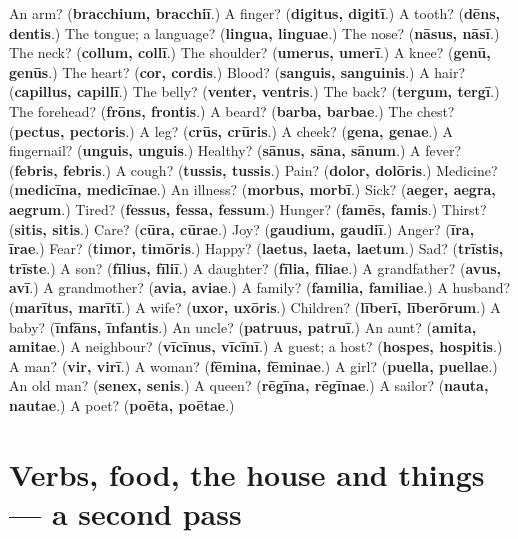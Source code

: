 \begin{tcolorbox}[breakable,colback=teal!4,colframe=teal!35!black,title={Before you move on}]
An arm? (\textbf{bracchium, bracchiī}.) A finger? (\textbf{digitus, digitī}.) A tooth? (\textbf{dēns, dentis}.) The tongue; a language? (\textbf{lingua, linguae}.) The nose? (\textbf{nāsus, nāsī}.) The neck? (\textbf{collum, collī}.) The shoulder? (\textbf{umerus, umerī}.) A knee? (\textbf{genū, genūs}.) The heart? (\textbf{cor, cordis}.) Blood? (\textbf{sanguis, sanguinis}.) A hair? (\textbf{capillus, capillī}.) The belly? (\textbf{venter, ventris}.) The back? (\textbf{tergum, tergī}.) The forehead? (\textbf{frōns, frontis}.) A beard? (\textbf{barba, barbae}.) The chest? (\textbf{pectus, pectoris}.) A leg? (\textbf{crūs, crūris}.) A cheek? (\textbf{gena, genae}.) A fingernail? (\textbf{unguis, unguis}.) Healthy? (\textbf{sānus, sāna, sānum}.) A fever? (\textbf{febris, febris}.) A cough? (\textbf{tussis, tussis}.) Pain? (\textbf{dolor, dolōris}.) Medicine? (\textbf{medicīna, medicīnae}.) An illness? (\textbf{morbus, morbī}.) Sick? (\textbf{aeger, aegra, aegrum}.) Tired? (\textbf{fessus, fessa, fessum}.) Hunger? (\textbf{famēs, famis}.) Thirst? (\textbf{sitis, sitis}.) Care? (\textbf{cūra, cūrae}.) Joy? (\textbf{gaudium, gaudiī}.) Anger? (\textbf{īra, īrae}.) Fear? (\textbf{timor, timōris}.) Happy? (\textbf{laetus, laeta, laetum}.) Sad? (\textbf{trīstis, trīste}.) A son? (\textbf{fīlius, fīliī}.) A daughter? (\textbf{fīlia, fīliae}.) A grandfather? (\textbf{avus, avī}.) A grandmother? (\textbf{avia, aviae}.) A family? (\textbf{familia, familiae}.) A husband? (\textbf{marītus, marītī}.) A wife? (\textbf{uxor, uxōris}.) Children? (\textbf{līberī, līberōrum}.) A baby? (\textbf{īnfāns, īnfantis}.) An uncle? (\textbf{patruus, patruī}.) An aunt? (\textbf{amita, amitae}.) A neighbour? (\textbf{vīcīnus, vīcīnī}.) A guest; a host? (\textbf{hospes, hospitis}.) A man? (\textbf{vir, virī}.) A woman? (\textbf{fēmina, fēminae}.) A girl? (\textbf{puella, puellae}.) An old man? (\textbf{senex, senis}.) A queen? (\textbf{rēgīna, rēgīnae}.) A sailor? (\textbf{nauta, nautae}.) A poet? (\textbf{poēta, poētae}.)
\end{tcolorbox}
\section[(dialogue)]{Verbs, food, the house and things — a second pass}

\label{lesson:LA-R85-second-pass-verbs-food-the-house-and-things}




